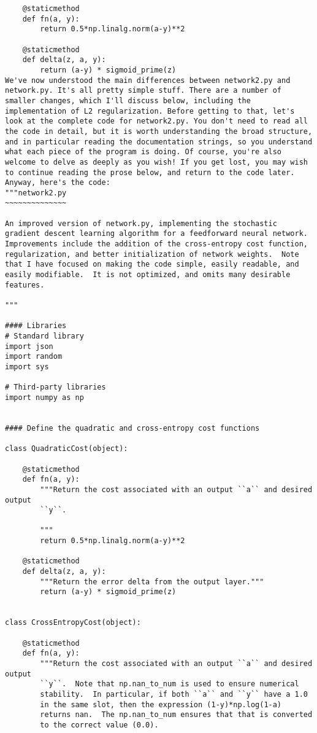\begin{lstlisting}
    @staticmethod
    def fn(a, y):
        return 0.5*np.linalg.norm(a-y)**2

    @staticmethod
    def delta(z, a, y):
        return (a-y) * sigmoid_prime(z)
We've now understood the main differences between network2.py and network.py. It's all pretty simple stuff. There are a number of smaller changes, which I'll discuss below, including the implementation of L2 regularization. Before getting to that, let's look at the complete code for network2.py. You don't need to read all the code in detail, but it is worth understanding the broad structure, and in particular reading the documentation strings, so you understand what each piece of the program is doing. Of course, you're also welcome to delve as deeply as you wish! If you get lost, you may wish to continue reading the prose below, and return to the code later. Anyway, here's the code:
"""network2.py
~~~~~~~~~~~~~~

An improved version of network.py, implementing the stochastic
gradient descent learning algorithm for a feedforward neural network.
Improvements include the addition of the cross-entropy cost function,
regularization, and better initialization of network weights.  Note
that I have focused on making the code simple, easily readable, and
easily modifiable.  It is not optimized, and omits many desirable
features.

"""

#### Libraries
# Standard library
import json
import random
import sys

# Third-party libraries
import numpy as np


#### Define the quadratic and cross-entropy cost functions

class QuadraticCost(object):

    @staticmethod
    def fn(a, y):
        """Return the cost associated with an output ``a`` and desired output
        ``y``.

        """
        return 0.5*np.linalg.norm(a-y)**2

    @staticmethod
    def delta(z, a, y):
        """Return the error delta from the output layer."""
        return (a-y) * sigmoid_prime(z)


class CrossEntropyCost(object):

    @staticmethod
    def fn(a, y):
        """Return the cost associated with an output ``a`` and desired output
        ``y``.  Note that np.nan_to_num is used to ensure numerical
        stability.  In particular, if both ``a`` and ``y`` have a 1.0
        in the same slot, then the expression (1-y)*np.log(1-a)
        returns nan.  The np.nan_to_num ensures that that is converted
        to the correct value (0.0).


\end{lstlisting}
